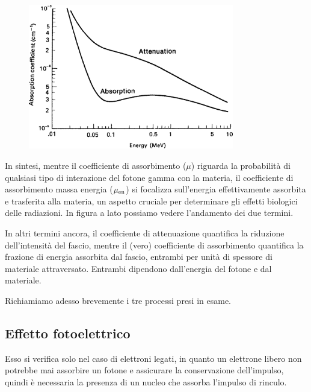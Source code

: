 \begin{approfondimento}
    \begin{minipage}{0.495\textwidth}
        \begin{figure}[H]
            \centering
            \includegraphics[width=0.8\textwidth]{immagini/coefficiente_assorbimento_vs_attenuazione.png}
        \end{figure}
    \end{minipage}
    \begin{minipage}{0.5\textwidth}
        In sintesi, mentre il coefficiente di assorbimento ($\mu$) riguarda la probabilità di qualsiasi tipo di interazione del fotone gamma con la materia, il coefficiente di assorbimento massa energia ($\mu_{\rm en}$) si focalizza sull'energia effettivamente assorbita e trasferita alla materia, un aspetto cruciale per determinare gli effetti biologici delle radiazioni. In figura a lato possiamo vedere l'andamento dei due termini.
    \end{minipage}

    \vspace{0.2cm}In altri termini ancora, il coefficiente di attenuazione quantifica la riduzione dell'intensità del fascio, mentre il (vero) coefficiente di assorbimento quantifica la frazione di energia assorbita dal fascio, entrambi per unità di spessore di materiale attraversato. Entrambi dipendono dall'energia del fotone e dal materiale.
\end{approfondimento}

Richiamiamo adesso brevemente i tre processi presi in esame.

\subsection{Effetto fotoelettrico}

Esso si verifica solo nel caso di elettroni legati, in quanto un elettrone libero non potrebbe mai assorbire un fotone e assicurare la conservazione dell'impulso, quindi è necessaria la presenza di un nucleo che assorba l'impulso di rinculo.

